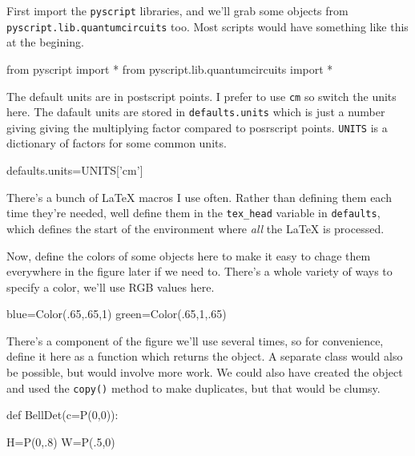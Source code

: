 \documentclass[a4paper]{book}
\begin{document}
First import the \Verb|pyscript| libraries, and we'll grab some objects
from \Verb|pyscript.lib.quantumcircuits| too. Most scripts would have
something like this at the begining.
\begin{python}
from pyscript import *
from pyscript.lib.quantumcircuits import *
\end{python}
The default units are in postscript points. I prefer to use
\texttt{cm} so switch the units here. The dafault units are stored in
\Verb|defaults.units| which is just a number giving giving the
multiplying factor compared to posrscript points. \Verb|UNITS| is a
dictionary of factors for some common units.
\begin{python}
defaults.units=UNITS['cm']
\end{python}
There's a bunch of \LaTeX{} macros I use often. Rather than defining
them each time they're needed, well define them in the \Verb|tex_head|
variable in \Verb|defaults|, which defines the start of the
environment where \emph{all} the \LaTeX{} is processed.
Now, define the colors of some objects here to make it easy to chage
them everywhere in the figure later if we need to. There's a whole
variety of ways to specify a color, we'll use RGB values here.
\begin{python}
blue=Color(.65,.65,1)
green=Color(.65,1,.65)
\end{python}
There's a component of the figure we'll use several times, so for
convenience, define it here as a function which returns the object. 
A separate class would also be possible, but would involve more work.
We could also have created the object and used the \Verb|copy()| method
to make duplicates, but that would be clumsy.
\begin{python}
def BellDet(c=P(0,0)):

    H=P(0,.8)
    W=P(.5,0)
\end{python}
\end{document}
